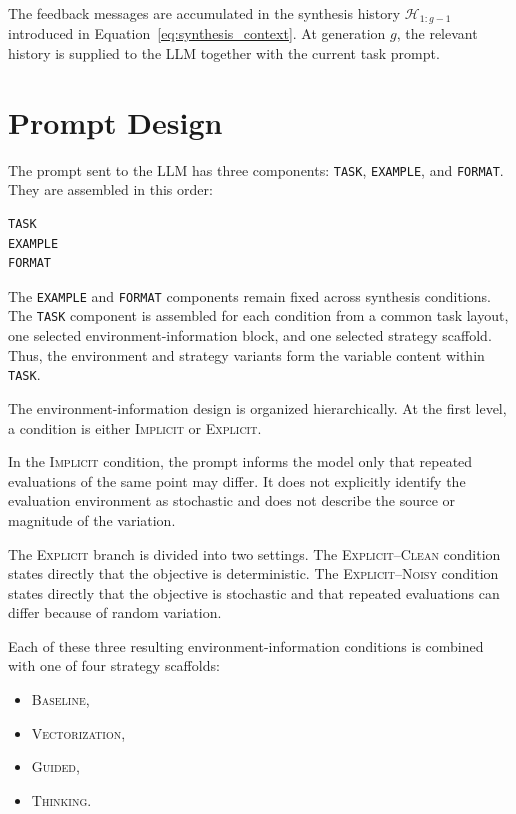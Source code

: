 The feedback messages are accumulated in the synthesis history
$\mathcal{H}_{1:g-1}$ introduced in
Equation~\ref{eq:synthesis_context}. At generation $g$, the relevant history
is supplied to the LLM together with the current task prompt.


\section{Prompt Design}
\label{sec:prompt_design}

The prompt sent to the LLM has three components: \texttt{TASK},
\texttt{EXAMPLE}, and \texttt{FORMAT}. They are assembled in this order:

\begin{verbatim}
TASK
EXAMPLE
FORMAT
\end{verbatim}

The \texttt{EXAMPLE} and \texttt{FORMAT} components remain fixed across
synthesis conditions. The \texttt{TASK} component is assembled for each
condition from a common task layout, one selected environment-information
block, and one selected strategy scaffold. Thus, the environment and strategy
variants form the variable content within \texttt{TASK}.

The environment-information design is organized hierarchically. At the first
level, a condition is either \textsc{Implicit} or \textsc{Explicit}.

In the \textsc{Implicit} condition, the prompt informs the model only that
repeated evaluations of the same point may differ. It does not explicitly
identify the evaluation environment as stochastic and does not describe the
source or magnitude of the variation.

The \textsc{Explicit} branch is divided into two settings. The
\textsc{Explicit--Clean} condition states directly that the objective is
deterministic. The \textsc{Explicit--Noisy} condition states directly that
the objective is stochastic and that repeated evaluations can differ because
of random variation.

Each of these three resulting environment-information conditions is combined
with one of four strategy scaffolds:

\begin{itemize}
    \item \textsc{Baseline},
    \item \textsc{Vectorization},
    \item \textsc{Guided},
    \item \textsc{Thinking}.
\end{itemize}

